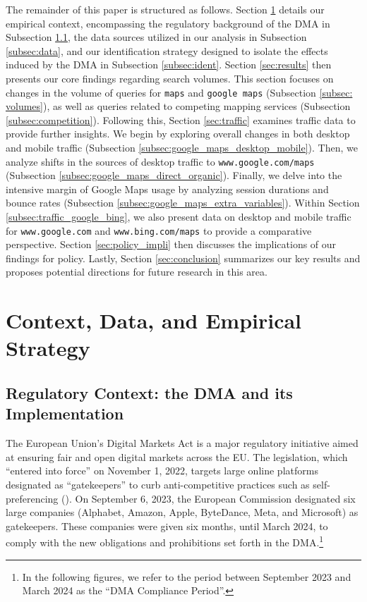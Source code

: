 \documentclass[11pt]{article}
\begin{document}
	The remainder of this paper is structured as follows. Section \ref{sec:ident_strat} details our empirical context, encompassing the regulatory background of the DMA in Subsection \ref{subsec:DMA}, the data sources utilized in our analysis in Subsection \ref{subsec:data}, and our identification strategy designed to isolate the effects induced by the DMA in Subsection \ref{subsec:ident}. Section \ref{sec:results} then presents our core findings regarding search volumes. This section focuses on changes in the volume of queries for \texttt{maps} and \texttt{google maps} (Subsection \ref{subsec: volumes}), as well as queries related to competing mapping services (Subsection \ref{subsec:competition}). Following this, Section \ref{sec:traffic} examines traffic data to provide further insights. We begin by exploring overall changes in both desktop and mobile traffic (Subsection \ref{subsec:google_maps_desktop_mobile}). Then, we analyze shifts in the sources of desktop traffic to \texttt{www.google.com/maps} (Subsection \ref{subsec:google_maps_direct_organic}). Finally, we delve into the intensive margin of Google Maps usage by analyzing session durations and bounce rates (Subsection \ref{subsec:google_maps_extra_variables}). Within Section \ref{subsec:traffic_google_bing}, we also present data on desktop and mobile traffic for \texttt{www.google.com} and \texttt{www.bing.com/maps} to provide a comparative perspective. Section \ref{sec:policy_impli} then discusses the implications of our findings for policy. Lastly, Section \ref{sec:conclusion} summarizes our key results and proposes potential directions for future research in this area.
	
	\section{Context, Data, and Empirical Strategy}\label{sec:ident_strat}
	\subsection{Regulatory Context: the DMA and its Implementation}\label{subsec:DMA}
	
	
	The European Union's Digital Markets Act  is a major regulatory initiative aimed at ensuring fair and open digital markets across the EU. The legislation, which ``entered into force'' on November 1, 2022, targets large online platforms designated as ``gatekeepers'' to curb anti-competitive practices such as self-preferencing (\citealp{cabral2021eu}). On September 6, 2023, the European Commission designated six large companies (Alphabet, Amazon, Apple, ByteDance, Meta, and Microsoft) as gatekeepers. These companies were given six months, until March 2024, to comply with the new obligations and prohibitions set forth in the DMA.\footnote{In the following figures, we refer to the period between September 2023 and March 2024 as the ``DMA Compliance Period''.} 
	
\end{document}
